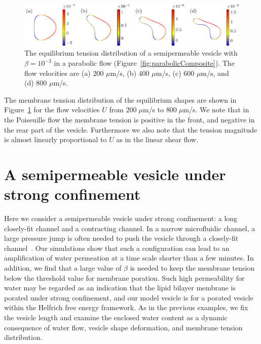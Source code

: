 \documentclass[prb,preprint,showpacs,preprintnumbers,amsmath,amssymb,longbibliography]{revtex4-1}
\newif\ifTikz
\begin{document}
\begin{figure}[htp]
  \centering
  \ifTikz
  
  \else
  \includegraphics{figures/parabolicTensions.pdf}
  \fi
  \caption{\label{fig:parabolicTensions} The equilibrium tension
  distribution of a semipermeable vesicle with $\beta=10^{-3}$ in a
  parabolic flow (Figure~\ref{fig:parabolicComposite}). The flow
  velocities are (a) 200 $\mu$m/s, (b) 400 $\mu$m/s, (c) 600 $\mu$m/s,
  and (d) 800 $\mu$m/s.}
\end{figure}
 The membrane tension distribution of the equilibrium shapes are shown
 in Figure~\ref{fig:parabolicTensions} for the flow velocities $U$ from
 $200\;\mu$m/s to $800 \;\mu$m/s. We note that in the Poiseuille flow
 the membrane tension is positive in the front, and negative in the rear
 part of the vesicle. Furthermore we also note that the tension
 magnitude is almost linearly proportional to $U$ as in the linear shear
 flow.


\section{A semipermeable vesicle under strong confinement\label{sec:confinement}}
Here we consider a semipermeable vesicle under strong confinement: a
long closely-fit channel and a contracting channel. In a narrow
microfluidic channel, a large pressure jump is often needed to push the
vesicle through a closely-fit channel~\cite{abk-fai-sto2006}.  Our
simulations show that such a configuration can lead to an amplification
of water permeation at a time scale shorter than a few minutes. In
addition, we find that a large value of $\beta$ is needed to keep the
membrane tension below the threshold value for membrane poration. Such
high permeability for water may be regarded as an indication that the
lipid bilayer membrane is porated under strong confinement, and our
model vesicle is for a porated vesicle within the Helfrich free energy
framework.  As in the previous examples, we fix the vesicle length and
examine the enclosed water content as a dynamic consequence of water
flow, vesicle shape deformation, and membrane tension distribution.
\end{document}
